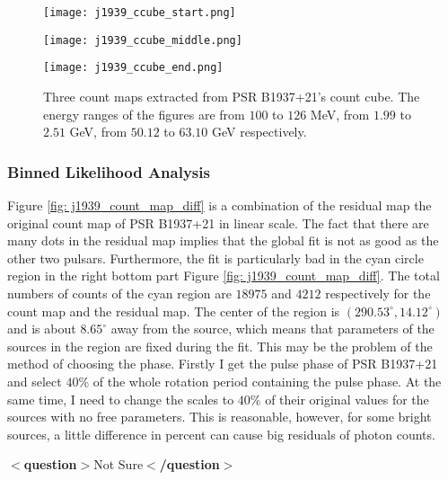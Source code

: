 \documentclass[12pt]{report}
\newcommand{\question}[1]{
  $<$\textbf{question}$>$#1$<$\textbf{/question}$>$
}
\begin{document}
        \begin{figure}[!htp]
          \begin{minipage}{0.32\textwidth}
            \begin{center} 
              \texttt{[image: j1939\_ccube\_start.png]}
            \end{center}
          \end{minipage}
          \begin{minipage}{0.32\textwidth}
            \begin{center}
              \texttt{[image: j1939\_ccube\_middle.png]}
            \end{center}
          \end{minipage}
          \begin{minipage}{0.32\textwidth}
            \begin{center}
            \texttt{[image: j1939\_ccube\_end.png]}
            \end{center}
          \end{minipage}
          \caption{Three count maps extracted from PSR B1937+21's count cube. The energy ranges 
            of the figures are from $100$ to $126$ MeV, from $1.99$ to $2.51$ GeV, from $50.12$ 
            to $63.10$ GeV respectively.}
          \label{fig: j1939_count_cube}
        \end{figure}

      \subsubsection{Binned Likelihood Analysis}
        Figure \ref{fig: j1939_count_map_diff} is a combination of the residual map the 
        original count map of PSR B1937+21 in linear scale. The fact that there are many 
        dots in the residual map implies that the global fit is not as good as the 
        other two pulsars. Furthermore, the fit is particularly bad in the cyan circle 
        region in the right bottom part Figure \ref{fig: j1939_count_map_diff}. 
        The total numbers of counts of the cyan region are $18975$ and $4212$ respectively 
        for the count map and the residual map. The center of the region is 
        $\left(290.53^{\circ}, 14.12^{\circ}\right)$ and is about $8.65^{\circ}$ away from 
        the source, which means that parameters of the sources in the region are fixed 
        during the fit. This may be the problem of the method of choosing the phase. 
        Firstly I get the pulse phase of PSR B1937+21 and select $40\%$ of the whole 
        rotation period containing the pulse phase. At the same time, I need to change the 
        scales to $40\%$ of their original values for the sources with no free 
        parameters. This is reasonable, however, for some bright sources, a little 
        difference in percent can cause big residuals of photon counts. 
        \question{Not Sure}
\end{document}
